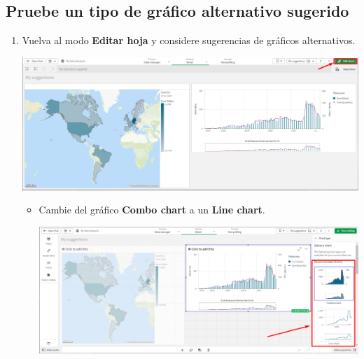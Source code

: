 \documentclass[12pt,letterpaper]{article}
\newcommand\tab[1][1cm]{\hspace*{#1}}
\begin{document}
    \subsection{Pruebe un tipo de gráfico alternativo sugerido}
    \begin{enumerate}[\tab 1.]
        \item Vuelva al modo \textbf{Editar hoja} y considere sugerencias de gráficos alternativos.
        \begin{center}
            \includegraphics[width=13cm]{./img/img23.png}
        \end{center}
        \begin{itemize}
            \item Cambie del gráfico \textbf{Combo chart} a un \textbf{Line chart}.
            \begin{center}
                \includegraphics[width=13cm]{./img/img23.1.png}
            \end{center}
        \end{itemize}
    \end{enumerate}
\end{document}
